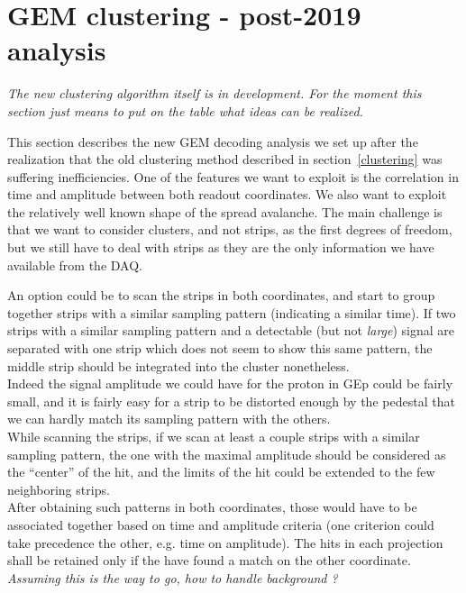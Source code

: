 \section{GEM clustering - post-2019 analysis}
\label{clustering_new}

{\em The new clustering algorithm itself is in development. For the moment this section just means to put on the table what ideas can be realized.}

This section describes the new GEM decoding analysis we set up after the realization that the old clustering method described in section~\ref{clustering} was suffering inefficiencies.
One of the features we want to exploit is the correlation in time and amplitude between both readout coordinates. We also want to exploit the relatively well known shape of the spread avalanche.
The main challenge is that we want to consider clusters, and not strips, as the first degrees of freedom, but we still have to deal with strips as they are the only information we have available from the DAQ.

An option could be to scan the strips in both coordinates, and start to group together strips with a similar sampling pattern (indicating a similar time). If two strips with a similar sampling pattern and a detectable (but not {\em large}) signal are separated with one strip which does not seem to show this same pattern, the middle strip should be integrated into the cluster nonetheless.\\
Indeed the signal amplitude we could have for the proton in GEp could be fairly small, and it is fairly easy for a strip to be distorted enough by the pedestal that we can hardly match its sampling pattern with the others.\\
While scanning the strips, if we scan at least a couple strips with a similar sampling pattern, the one with the maximal amplitude should be considered as the ``center'' of the hit, and the limits of the hit could be extended to the few neighboring strips.\\
After obtaining such patterns in both coordinates, those would have to be associated together based on time and amplitude criteria (one criterion could take precedence the other, e.g. time on amplitude). The hits in each projection shall be retained only if the have found a match on the other coordinate.
{\em Assuming this is the way to go, how to handle background ?}\\

